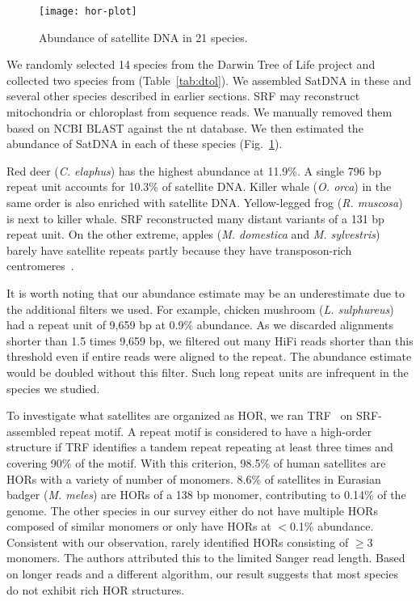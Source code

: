 \documentclass{bioinfo}
\begin{document}
\begin{figure}
\texttt{[image: hor-plot]}
\caption{Abundance of satellite DNA in 21 species.}\label{fig:dtol}
\end{figure}

We randomly selected 14 species from the Darwin Tree of Life project and
collected two species from \citet{Hon:2020aa} (Table~\ref{tab:dtol}). We assembled
SatDNA in these and several other species described in earlier sections.
SRF may reconstruct mitochondria or chloroplast from sequence reads.
We manually removed them based on NCBI BLAST against the nt database.
We then estimated the abundance of SatDNA in each of these species (Fig.~\ref{fig:dtol}).

Red deer (\emph{C. elaphus}) has the highest abundance at 11.9\%. A single
796 bp repeat unit accounts for 10.3\% of satellite DNA. Killer whale (\emph{O.
orca}) in the same order is also enriched with satellite DNA. Yellow-legged
frog (\emph{R. muscosa}) is next to killer whale. SRF reconstructed many
distant variants of a 131 bp repeat unit. On the other extreme, apples (\emph{M.
domestica} and \emph{M. sylvestris}) barely have satellite repeats partly
because they have transposon-rich centromeres~\citep{Zhang:2019ab}.

It is worth noting that our abundance estimate may be an underestimate due to
the additional filters we used. For example, chicken mushroom (\emph{L.
sulphureus}) had a repeat unit of 9,659 bp at 0.9\% abundance. As we discarded
alignments shorter than 1.5 times 9,659 bp, we filtered out many HiFi reads
shorter than this threshold even if entire reads were aligned to the repeat.
The abundance estimate would be doubled without this filter. Such long repeat
units are infrequent in the species we studied.

To investigate what satellites are organized as HOR, we ran
TRF~\citep{Benson:1999aa} on SRF-assembled repeat motif. A repeat motif is
considered to have a high-order structure if TRF identifies a tandem repeat
repeating at least three times and covering 90\% of the motif. With this
criterion, 98.5\% of human satellites are HORs with a variety of number of
monomers. 8.6\% of satellites in Eurasian badger (\emph{M. meles}) are HORs of
a 138 bp monomer, contributing to 0.14\% of the genome. The other species in
our survey either do not have multiple HORs composed of similar monomers or
only have HORs at $<$0.1\% abundance. Consistent with our observation,
\citet{Melters:2013va} rarely identified HORs consisting of $\ge$3 monomers.
The authors attributed this to the limited Sanger read length. Based on longer
reads and a different algorithm, our result suggests that most species do not
exhibit rich HOR structures.
\end{document}
